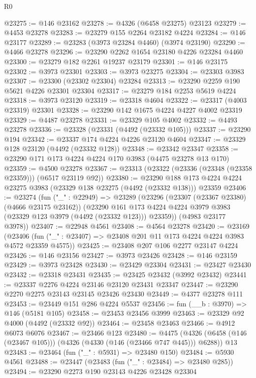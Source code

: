 \begin{lexlean}{R0}
\begin{coremodule}
@23275 := @146 @23162
@23278 := @4326 (@6458 @23275) @23123
@23279 := @4453 @23278
@23283 := @23279 @155 @2264 @23182 @4224
@23284 := @146 @23177
@23289 := @23283 (@3973 @23284 @4460) (@3974 @23190)
@23290 := @4466 @23278
@23296 := @23290 @2262 @1654 @23180 @4226 @23284 @4460
@23300 := @23279 @182 @2261 @19237 @23179
@23301 := @146 @23175
@23302 := @3973 @23301
@23303 := @3973 @23275
@23304 := @23303 @3983
@23307 := @23300 (@23302 @23304) @23284
@23313 := @23290 @2259 @190 @5621 @4226 @23301 @23304
@23317 := @23279 @184 @2253 @5619 @4224
@23318 := @3973 @23120
@23319 := @23318 @4604
@23322 := @23317 (@4003 @23319) @23301
@23328 := @23290 @142 @1675 @4224 @4227 @4002 @23319
@23329 := @4487 @23278
@23331 := @23329 @105 @4002
@23332 := @4493 @23278
@23336 := @23328 (@23331 (@4492 (@23332 @105)))
@23337 := @23290 @194
@23342 := @23337 @174 @4224 @4226 @23120 @4604
@23347 := @23329 @128 @23120 (@4492 (@23332 @128))
@23348 := @23342 @23347
@23358 := @23290 @171 @173 @4224 @4224 @170 @3983 (@4475 @23278 @13 @170)
@23359 := @4500 @23278
@23367 := @23313 (@23322 (@23336 (@23348 (@23358 @23359))) (@6517 @23119 @92))
@23380 := @23290
    @188
    @173
    @4224
    @4224
    @23275
    @3983
    (@23329 @138 @23275 (@4492 (@23332 @138)))
    @23359
@23406 := @23274
    (fun ("_" : @22949) =>
    @23289
      (@23296
        (@23307 (@23367 @23380) (@4666 @23175 @23162))
        (@23290 @161 @173 @4224 @4224 @3979 @3983 (@23329 @123 @3979 (@4492 (@23332 @123))) @23359))
      (@4983 @23177 @3978))
@23407 := @22948 @4561
@23408 := @4564 @23278
@23420 := @23169
    (@23406 (fun ("_" : @23407) => @23408 @201 @11 @173 @4224 @4224 @3983 @4572 @23359 @4575))
@23425 := @23408 @207 @106 @2277 @23147 @4224
@23426 := @146 @23156
@23427 := @3973 @23426
@23428 := @146 @23159
@23429 := @3973 @23428
@23430 := @23429 @23304
@23431 := @23427 @23430
@23432 := @23318 @23431
@23435 := @23425 @23432 (@3992 @23432)
@23441 := @23337 @2276 @4224 @23146 @23120 @23431 @23347
@23447 := @23290 @2270 @2275 @23143 @23145 @23426 @23430
@23449 := @4377 @23278 @111
@23453 := @23449 @151 @286 @4224 @5537
@23456 := fun (__b : @3970) => @146 (@5181 @105)
@23458 := @23453 @23456 @3999
@23463 := @23329 @92 @4000 (@4492 (@23332 @92))
@23464 := @23458 @23463
@23466 := @4912 @6073 @6076
@23467 := @23466 @123
@23480 := @4475
    (@4326 (@6458 (@146 (@23467 @105))) (@4326 (@4330 (@146 (@23466 @747 @445))) @6288))
    @13
@23483 := @23464 (fun ("_" : @5931) => @23480 @150)
@23484 := @5930 @4561
@23488 := @23447 (@23483 (fun ("_" : @23484) => @23480 @285))
@23494 := @23290 @2273 @190 @23143 @4226 @23428 @23304

\end{coremodule}
\end{lexlean}
